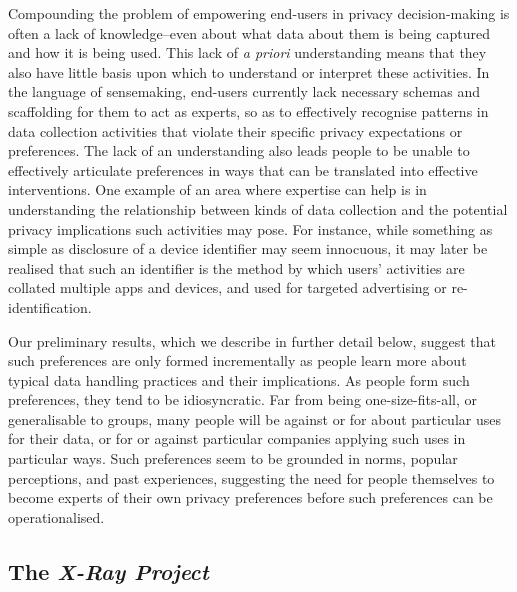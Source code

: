\documentclass[sigchi-a, authorversion]{acmart}
\begin{document}
Compounding the problem of empowering end-users in privacy decision-making is often a lack of knowledge--even about what data about them is being captured and how it is being used.  This lack of \emph{a priori} understanding means that they also have little basis upon which to understand or interpret these activities. In the language of sensemaking, end-users currently lack necessary schemas and scaffolding for them to act as experts, so as to effectively recognise patterns in data collection activities that violate their specific privacy expectations or preferences.  The lack of an understanding also leads people to be unable to effectively articulate preferences in ways that can be translated into effective interventions. One example of an area where expertise can help is in understanding the relationship between kinds of data collection and the potential privacy implications such activities may pose. For instance, while something as simple as disclosure of a device identifier may seem innocuous, it may later be realised that such an identifier is the method by which users' activities are collated multiple apps and devices, and used for targeted advertising or re-identification.

Our preliminary results, which we describe in further detail below, suggest that such preferences are only formed incrementally as people learn more about typical data handling practices and their implications.  As people form such preferences, they tend to be idiosyncratic. Far from being one-size-fits-all, or generalisable to groups, many people will be against or for about particular uses for their data, or for or against particular companies applying such uses in particular ways. Such preferences seem to be grounded in norms, popular perceptions, and past experiences, suggesting the need for people themselves to become experts of their own privacy preferences before such preferences can be operationalised.


\subsection{The \emph{X-Ray Project}}
\end{document}
